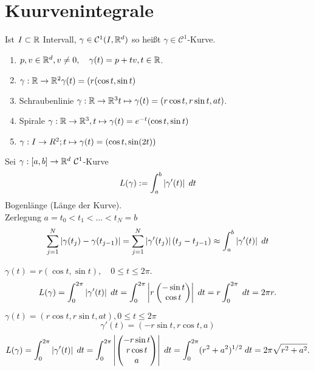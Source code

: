 \documentclass[../ana2.tex]{subfiles}
\begin{document}
\setcounter{section}{18}
\section{Kuurvenintegrale}
\begin{defi}
    Ist \( I \subset \R \) Intervall, \( \gamma \in \mathcal{C}^1(I, \R^d) \)
    so heißt \(\gamma \in \mathcal{C}^1\)-Kurve.
\end{defi}
\begin{bspe}\leavevmode
    \begin{enumerate}
    \item \( p, v \in \R^d, v \neq 0, \quad \gamma(t) = p + tv, t \in \R \).
    \item \(\abb{\gamma}{\R}{\R^2} \gamma(t) = (r(\cos t, \sin t) \)
    \item Schraubenlinie \( \abb{\gamma}{\R}{\R^3} t \mapsto \gamma(t) = (r \cos t, r \sin t, at) \).
    \item Spirale \( \abb{\gamma}{\R}{\R^3}, t \mapsto \gamma(t) = e^{-t} (\cos t, \sin t) \)
    \item \( \abb{\gamma}{I}{R^2}; t \mapsto \gamma(t) = (\cos t, \sin (2t))\)
    \end{enumerate}
\end{bspe}
\begin{defi}[Bogenlänge]
    Sei \(\abb{\gamma}{[a,b]}{\R^d}\ \mathcal{C}^1\)-Kurve
    \[ L(\gamma) := \integralx{\abs{\gamma'(t)}}{a}{b}{t} \]
    Bogenlänge (Länge der Kurve).\\
    Zerlegung \(a = t_0 < t_1 < \ldots < t_N = b\)
    \[ \sum_{j=1}^N \abs{\gamma(t_j) - \gamma(t_{j-1})} 
    = \sum_{j=1}^N \abs{\gamma'(t_j)} (t_j - t_{j-1}) 
    \approx \integralx{\abs{\gamma'(t)}}{a}{b}{t} \]
\end{defi}
\begin{bsp}
    \( \gamma(t) = r (\cos t, \sin t), \quad 0 \leq t \leq 2\pi \).
    \[ L(\gamma) = \integralx{\abs{\gamma'(t)}}{0}{2\pi}{t}
    = \integralx{\abs{r \begin{pmatrix}
        -\sin t \\ \cos t
    \end{pmatrix}}}{0}{2\pi}{t} 
    = r \integralx{}{0}{2\pi}{t} = 2\pi r. \]
\end{bsp}
\begin{bsp}
    \(\gamma(t) = (r\cos t, r\sin t, at), 0 \leq t \leq 2 \pi \)
    \[ \gamma'(t) = (-r\sin t, r\cos t, a) \]
    \[ L(\gamma) = \integralx{\abs{\gamma'(t)}}{0}{2\pi}{t} 
    = \integralx{\abs{ \begin{pmatrix}
        -r \sin t \\ r \cos t \\ a
    \end{pmatrix} }}{0}{2\pi}{t} 
    = \integralx{(r^2 + a^2)^{1/2}}{0}{2\pi}{t} 
    = 2\pi \sqrt{r^2 + a^2}. \]
\end{bsp}
\end{document}
